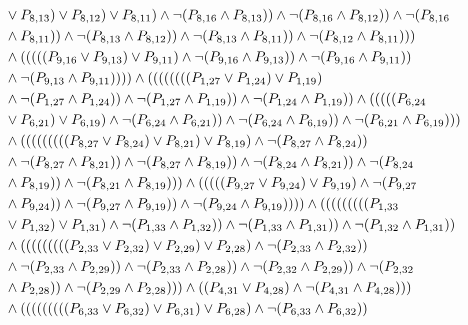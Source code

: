 \documentclass[10pt]{article}
\begin{document}
\begin{align*}
& \lor \PV{8,13}) \lor \PV{8,12}) \lor \PV{8,11}) \land \lnot(\PV{8,16} \land \PV{8,13})) \land \lnot(\PV{8,16} \land \PV{8,12})) \land \lnot(\PV{8,16} \\
& \land \PV{8,11})) \land \lnot(\PV{8,13} \land \PV{8,12})) \land \lnot(\PV{8,13} \land \PV{8,11})) \land \lnot(\PV{8,12} \land \PV{8,11}))) \\
& \land (((((\PV{9,16} \lor \PV{9,13}) \lor \PV{9,11}) \land \lnot(\PV{9,16} \land \PV{9,13})) \land \lnot(\PV{9,16} \land \PV{9,11})) \\
& \land \lnot(\PV{9,13} \land \PV{9,11})))) \land ((((((((\PV{1,27} \lor \PV{1,24}) \lor \PV{1,19}) \\
& \land \lnot(\PV{1,27} \land \PV{1,24})) \land \lnot(\PV{1,27} \land \PV{1,19})) \land \lnot(\PV{1,24} \land \PV{1,19})) \land (((((\PV{6,24} \\
& \lor \PV{6,21}) \lor \PV{6,19}) \land \lnot(\PV{6,24} \land \PV{6,21})) \land \lnot(\PV{6,24} \land \PV{6,19})) \land \lnot(\PV{6,21} \land \PV{6,19}))) \\
& \land (((((((((\PV{8,27} \lor \PV{8,24}) \lor \PV{8,21}) \lor \PV{8,19}) \land \lnot(\PV{8,27} \land \PV{8,24})) \\
& \land \lnot(\PV{8,27} \land \PV{8,21})) \land \lnot(\PV{8,27} \land \PV{8,19})) \land \lnot(\PV{8,24} \land \PV{8,21})) \land \lnot(\PV{8,24} \\
& \land \PV{8,19})) \land \lnot(\PV{8,21} \land \PV{8,19}))) \land (((((\PV{9,27} \lor \PV{9,24}) \lor \PV{9,19}) \land \lnot(\PV{9,27} \\
& \land \PV{9,24})) \land \lnot(\PV{9,27} \land \PV{9,19})) \land \lnot(\PV{9,24} \land \PV{9,19})))) \land (((((((((\PV{1,33} \\
& \lor \PV{1,32}) \lor \PV{1,31}) \land \lnot(\PV{1,33} \land \PV{1,32})) \land \lnot(\PV{1,33} \land \PV{1,31})) \land \lnot(\PV{1,32} \land \PV{1,31})) \\
& \land (((((((((\PV{2,33} \lor \PV{2,32}) \lor \PV{2,29}) \lor \PV{2,28}) \land \lnot(\PV{2,33} \land \PV{2,32})) \\
& \land \lnot(\PV{2,33} \land \PV{2,29})) \land \lnot(\PV{2,33} \land \PV{2,28})) \land \lnot(\PV{2,32} \land \PV{2,29})) \land \lnot(\PV{2,32} \\
& \land \PV{2,28})) \land \lnot(\PV{2,29} \land \PV{2,28}))) \land ((\PV{4,31} \lor \PV{4,28}) \land \lnot(\PV{4,31} \land \PV{4,28}))) \\
& \land (((((((((\PV{6,33} \lor \PV{6,32}) \lor \PV{6,31}) \lor \PV{6,28}) \land \lnot(\PV{6,33} \land \PV{6,32})) \\

\end{align*}
\end{document}
